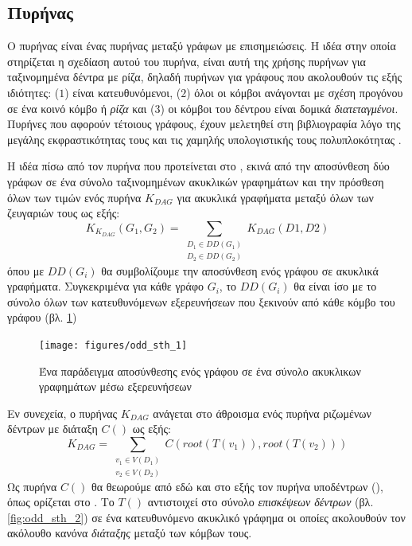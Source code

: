 \subsection{Πυρήνας }
Ο πυρήνας  είναι ένας πυρήνας μεταξύ γράφων με επισημειώσεις.
Η ιδέα στην οποία στηρίζεται η σχεδίαση αυτού του πυρήνα, είναι αυτή της χρήσης πυρήνων για ταξινομημένα δέντρα με ρίζα, δηλαδή πυρήνων για γράφους που ακολουθούν τις εξής ιδιότητες: ($1$) είναι κατευθυνόμενοι, ($2$) όλοι οι κόμβοι ανάγονται με σχέση προγόνου σε ένα κοινό κόμβο ή \textit{ρίζα} και ($3$) οι κόμβοι του δέντρου είναι δομικά \textit{διατεταγμένοι}.
Πυρήνες που αφορούν τέτοιους γράφους, έχουν μελετηθεί στη βιβλιογραφία λόγο της μεγάλης εκφραστικότητας τους και τις χαμηλής υπολογιστικής τους πολυπλοκότητας \cite{Haussler99ck, MA_ECML_2006, Vishwanathan2002}.\par
Η ιδέα πίσω από τον πυρήνα  που προτείνεται στο \cite{Martino2012ATK}, εκινά από την αποσύνθεση δύο γράφων σε ένα σύνολο ταξινομημένων ακυκλικών γραφημάτων και την πρόσθεση όλων των τιμών ενός πυρήνα $K_{DAG}$ για ακυκλικά γραφήματα μεταξύ όλων των ζευγαριών τους ως εξής:
\begin{equation}
K_{K_{DAG}}(G_{1}, G_{2}) = \sum_{\substack{D_{1} \in DD(G_{1}) \\
D_{2} \in DD(G_{2})}} K_{DAG}(D1, D2)
\end{equation}
όπου με $DD(G_{i})$ θα συμβολίζουμε την αποσύνθεση ενός γράφου σε ακυκλικά γραφήματα.
Συγκεκριμένα για κάθε γράφο $G_{i}$, το $DD(G_{i})$ θα είναι ίσο με το σύνολο όλων των κατευθυνόμενων εξερευνήσεων  που ξεκινούν από κάθε κόμβο του γράφου (βλ. \ref{fig:odd:bfs_explorations})
\begin{figure}[]
\centering
\texttt{[image: figures/odd\_sth\_1]}
\caption{Ένα παράδειγμα αποσύνθεσης ενός γράφου σε ένα σύνολο ακυκλικων γραφημάτων μέσω εξερευνήσεων }
\label{fig:odd:bfs_explorations}
\end{figure}
Εν συνεχεία, ο πυρήνας $K_{DAG}$ ανάγεται στο άθροισμα ενός πυρήνα ριζωμένων δέντρων με διάταξη $C()$ ως εξής:
\begin{equation}
K_{DAG} = \sum_{\substack{v_{1} \in V(D_{1}) \\ v_{2} \in V(D_{2})}} C(root(T(v_{1})), root(T(v_{2})))
\end{equation}
Ως πυρήνα $C()$ θα θεωρούμε από εδώ και στο εξής τον πυρήνα υποδέντρων (), όπως ορίζεται στο \cite{STKernel}.
Το $T()$ αντιστοιχεί στο σύνολο \textit{επισκέψεων δέντρων} (βλ. \ref{fig:odd_sth_2}) σε ένα κατευθυνόμενο ακυκλικό γράφημα οι οποίες ακολουθούν τον ακόλουθο κανόνα \textit{διάταξης} μεταξύ των κόμβων τους.
